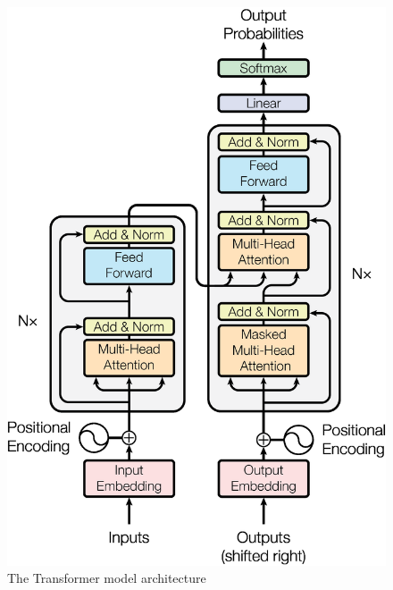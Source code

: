 \begin{minipage}[ht]{.6\textwidth}
    \begin{figure}[H]
        \centering
        \includegraphics[width=\textwidth]{literature/imgs/ext-transformer.png}
        \caption{The Transformer model architecture \cite{vaswani2017attention}}
        \label{fig:ext-transformer}
    \end{figure}
\end{minipage}
